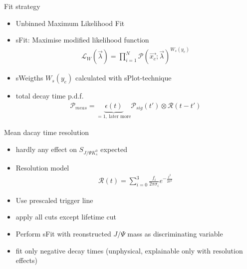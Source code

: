 \documentclass{beamer}
\newcommand{\SJPsi}{S_{J/\Psi K_s^0}}
\begin{document}
	\begin{frame}{Fit strategy}
	\begin{itemize}
	\item Unbinned Maximum Likelihood Fit
	\item sFit: Maximise modified likelihood function
	\begin{align}
	\mathcal{L}_W(\vec{\lambda}) = \prod_{i=1}^N \mathcal{P}(\vec{x_e};\vec{\lambda})^{W_s(y_e)}
	\end{align}
	\item sWeigths $W_s(y_e)$ calculated with sPlot-technique
	\item total decay time p.d.f.
	\begin{align}
	\mathcal{P}_{meas} = \underbrace{\epsilon(t)}_{= 1,\ \text{later more}}\mathcal{P}_{sig}(t') \otimes \mathcal{R}(t-t')
	\end{align}
	\end{itemize}
	\end{frame}
	
	\begin{frame}{Mean dacay time resolution}
	\begin{itemize}
    \item hardly any effect on $\SJPsi$ expected
	\item Resolution model
	\begin{align}
	\mathcal{R}(t) = \sum_{i=0}^3 \frac{f_i}{2\pi\sigma_i}e^{-\tfrac{t^2}{2\sigma^2}}
	\end{align}
	\item Use prescaled trigger line
	\item apply all cuts except lifetime cut
	\item Perform sFit with reonstructed $J/\Psi$ mass as discriminating variable
	\item fit only negative decay times (unphysical, explainable only with resolution effects)
	\end{itemize}
	\end{frame}
	
\end{document}
